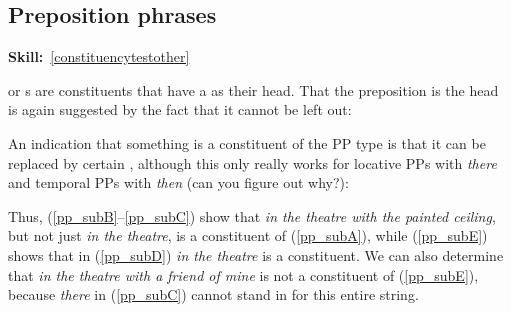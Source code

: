 \documentclass{article}
\begin{document}
\subsection{Preposition phrases}
\hfill{}\textbf{Skill:}~\ref{constituencytestother}

 or s are constituents that have a  as their head.
That the preposition is the head is again suggested by the fact that it cannot be left out:
\begin{exe}
\end{exe}

An indication that something is a constituent of the PP type is that it can be replaced by certain , although this only really works for locative PPs with \emph{there} and temporal PPs with \emph{then} (can you figure out why?):
\begin{exe}
\end{exe}

Thus, (\ref{pp_subB}--\ref{pp_subC}) show that \emph{in the theatre with the painted ceiling}, but not just \emph{in the theatre}, is a constituent of (\ref{pp_subA}), while (\ref{pp_subE}) shows that in (\ref{pp_subD}) \emph{in the theatre} is a constituent.
We can also determine that \emph{in the theatre with a friend of mine} is not a constituent of (\ref{pp_subE}), because \emph{there} in (\ref{pp_subC}) cannot stand in for this entire string.
\begin{exe}
\end{exe}
\end{document}
